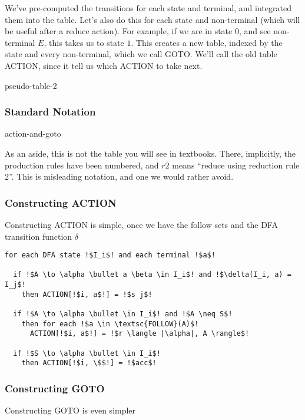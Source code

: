 We've pre-computed the transitions for each state and terminal, and integrated them into the table. Let's also do this for each state and non-terminal (which will be useful after a reduce action). For example, if we are in state $0$, and see non-terminal $E$, this takes us to state $1$. This creates a new table, indexed by the state and every non-terminal, which we call GOTO. We'll call the old table ACTION, since it tell us which ACTION to take next.

\begin{center}
    {pseudo-table-2}
\end{center}

\subsubsection{Standard Notation}
\begin{center}
    {action-and-goto}
\end{center}
As an aside, this is not the table you will see in textbooks. There, implicitly, the production rules have been numbered, and $r2$ means ``reduce using reduction rule 2''. This is misleading notation, and one we would rather avoid.

\subsubsection{Constructing ACTION}
Constructing ACTION is simple, once we have the follow sets and the DFA transition function $\delta$

\begin{code}
\begin{lstlisting}[style=pseudocode]
for each DFA state !$I_i$! and each terminal !$a$!

  if !$A \to \alpha \bullet a \beta \in I_i$! and !$\delta(I_i, a) = I_j$! 
    then ACTION[!$i, a$!] = !$s j$!
    
  if !$A \to \alpha \bullet \in I_i$! and !$A \neq S$! 
    then for each !$a \in \textsc{FOLLOW}(A)$!
      ACTION[!$i, a$!] = !$r \langle |\alpha|, A \rangle$!
      
  if !$S \to \alpha \bullet \in I_i$! 
    then ACTION[!$i, \$$!] = !$acc$!
\end{lstlisting}
\vspace{1mm}
\end{code}

\subsubsection{Constructing GOTO}
Constructing GOTO is even simpler

